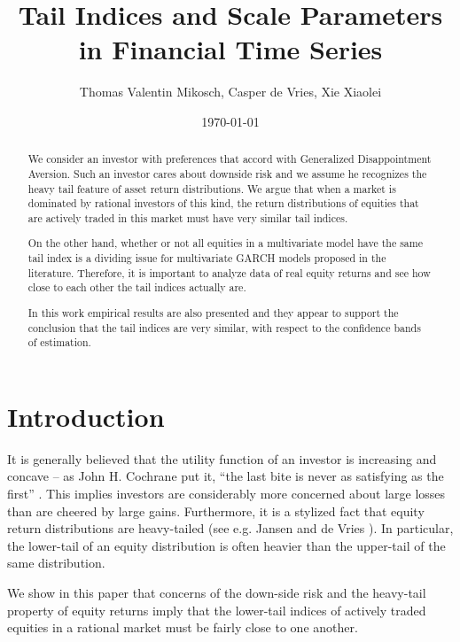 \documentclass{article}
\title{Tail Indices and Scale Parameters in Financial Time Series}
\author{Thomas Valentin Mikosch, Casper de Vries, Xie Xiaolei}
\date{\today}
\begin{document}
\maketitle

\begin{abstract}
We consider an investor with preferences that accord with Generalized
Disappointment Aversion. Such an investor cares about downside risk and
we assume he recognizes the heavy tail feature of asset return
distributions. We argue that when a market is dominated by rational
investors of this kind, the return distributions of equities that are
actively traded in this market must have very similar tail indices.

On the other hand, whether or not all equities in a multivariate model
have the same tail index is a dividing issue for multivariate GARCH
models proposed in the literature. Therefore, it is important to analyze
data of real equity returns and see how close to each other the
tail indices actually are.

In this work empirical results are also presented and they appear
to support the conclusion that the tail indices are very similar,
with respect to the confidence bands of estimation.
\end{abstract}

\section{Introduction}
It is generally believed that the utility function of an
investor is increasing and concave -- as John H. Cochrane
put it, ``the last bite is never as satisfying as the first''
\cite{cochrane2009asset}. This implies investors are considerably
more concerned about large losses than are cheered by large gains.
Furthermore, it is a stylized fact that equity return distributions
are heavy-tailed (see e.g. Jansen and de Vries \cite{jansen1991frequency}).
In particular, the lower-tail of an equity distribution is often heavier
than the upper-tail of the same distribution.

We show in this paper that concerns of the down-side risk and the
heavy-tail property of equity returns  imply that the lower-tail indices
of actively traded equities in a rational market must be fairly close to
one another.

\end{document}
